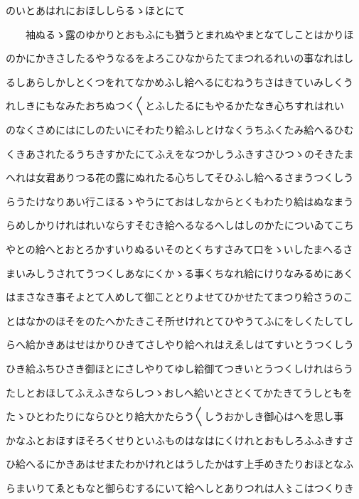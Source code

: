\documentclass[a4paper,11pt,landscape]{ltjtarticle}
\begin{document}
\par\medskip
のいとあはれにおほししらるゝほとにて
\par\medskip
　　袖ぬるゝ露のゆかりとおもふにも猶うとまれぬやまとなてしことはかりほ
\par\medskip
のかにかきさしたるやうなるをよろこひなからたてまつれるれいの事なれはし
\par\medskip
るしあらしかしとくつをれてなかめふし給へるにむねうちさはきていみしくう
\par\medskip
れしきにもなみたおちぬつく〱とふしたるにもやるかたなき心ちすれはれい
\par\medskip
のなくさめにはにしのたいにそわたり給ふしとけなくうちふくたみ給へるひむ
\par\medskip
くきあされたるうちきすかたにてふえをなつかしうふきすさひつゝのそきたま
\par\medskip
へれは女君ありつる花の露にぬれたる心ちしてそひふし給へるさまうつくしう
\par\medskip
らうたけなりあい行こほるゝやうにておはしなからとくもわたり給はぬなまう
\par\medskip
らめしかりけれはれいならすそむき給へるなるへしはしのかたについゐてこち
\par\medskip
やとの給へとおとろかすいりぬるいそのとくちすさみて口をゝいしたまへるさ
\par\medskip
まいみしうされてうつくしあなにくかゝる事くちなれ給にけりなみるめにあく
\par\medskip
はまさなき事そよとて人めして御こととりよせてひかせたてまつり給さうのこ
\par\medskip
とはなかのほそをのたへかたきこそ所せけれとてひやうてふにをしくたしてし
\par\medskip
らへ給かきあはせはかりひきてさしやり給へれはえゑしはてすいとうつくしう
\par\medskip
ひき給ふちひさき御ほとにさしやりてゆし給御てつきいとうつくしけれはらう
\par\medskip
たしとおほしてふえふきならしつゝおしへ給いとさとくてかたきてうしともを
\par\medskip
たゝひとわたりにならひとり給大かたらう〱しうおかしき御心はへを思し事
\par\medskip
かなふとおほすほそろくせりといふものはなはにくけれとおもしろふふきすさ
\par\medskip
ひ給へるにかきあはせまたわかけれとはうしたかはす上手めきたりおほとなふ
\par\medskip
らまいりてゑともなと御らむするにいて給へしとありつれは人〻こはつくりき
\par\medskip
\end{document}
